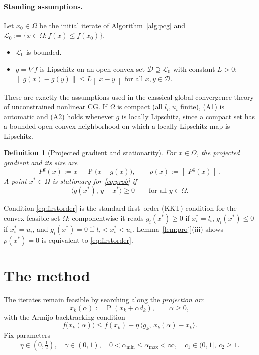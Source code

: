 \documentclass[12pt]{article}
\newtheorem{definition}{Definition}
\DeclareMathOperator{\proj}{P}
\newcommand{\norm}[1]{\left\lVert #1 \right\rVert}
\newcommand{\inner}[2]{\langle #1,\, #2\rangle}
\begin{document}
\paragraph{Standing assumptions.} Let $x_0\in\Omega$ be the initial iterate of
Algorithm~\ref{alg:pcg} and $\mathcal L_0:=\{x\in\Omega: f(x)\le f(x_0)\}$.
\begin{itemize}
\item[(A1)] $\mathcal L_0$ is bounded.
\item[(A2)] $g=\nabla f$ is Lipschitz on an open convex set
$\mathcal D\supseteq\mathcal L_0$ with constant $L>0$:
$\norm{g(x)-g(y)}\le L\norm{x-y}$ for all $x,y\in\mathcal D$.
\end{itemize}
These are exactly the assumptions used in the classical global convergence
theory of unconstrained nonlinear CG. If $\Omega$ is compact (all $l_i,u_i$
finite), (A1) is automatic and (A2) holds whenever $g$ is locally Lipschitz,
since a compact set has a bounded open convex neighborhood on which a locally
Lipschitz map is Lipschitz.

\begin{definition}[Projected gradient and stationarity]\label{def:stat}
For $x\in\Omega$, the \emph{projected gradient} and its size are
\begin{equation}\label{eq:pgrad}
P^{\mathrm g}(x):=x-\proj\!\big(x-g(x)\big),\qquad \rho(x):=\norm{P^{\mathrm g}(x)}.
\end{equation}
A point $x^*\in\Omega$ is \emph{stationary} for \eqref{eq:prob} if
\begin{equation}\label{eq:firstorder}
\inner{g(x^*)}{y-x^*}\ge0\qquad\text{for all }y\in\Omega.
\end{equation}
\end{definition}

Condition \eqref{eq:firstorder} is the standard first--order (KKT) condition for
the convex feasible set $\Omega$; componentwise it reads $g_i(x^*)\ge0$ if
$x^*_i=l_i$, $g_i(x^*)\le0$ if $x^*_i=u_i$, and $g_i(x^*)=0$ if
$l_i<x^*_i<u_i$. Lemma~\ref{lem:proj}(iii) shows $\rho(x^*)=0$ is equivalent to
\eqref{eq:firstorder}.

\section{The method}\label{sec:alg}

The iterates remain feasible by searching along the \emph{projection arc}
\begin{equation}\label{eq:arc}
x_k(\alpha):=\proj(x_k+\alpha d_k),\qquad\alpha\ge0,
\end{equation}
with the Armijo backtracking condition
\begin{equation}\label{eq:armijo}
f\big(x_k(\alpha)\big)\le f(x_k)+\eta\,\inner{g_k}{x_k(\alpha)-x_k}.
\end{equation}
Fix parameters
\begin{equation}\label{eq:params}
\eta\in(0,\tfrac12),\quad\gamma\in(0,1),\quad
0<\alpha_{\min}\le\alpha_{\max}<\infty,\quad c_1\in(0,1],\ c_2\ge1.
\end{equation}
\end{document}
